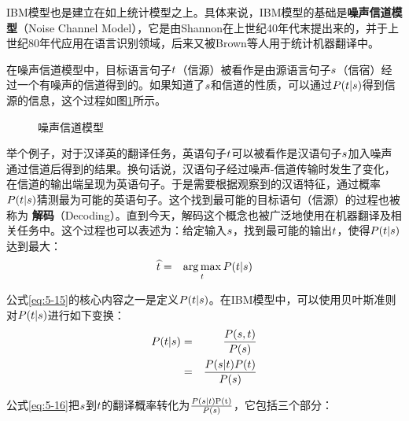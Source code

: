 \vspace{-0.5em}
\parinterval IBM模型也是建立在如上统计模型之上。具体来说，IBM模型的基础是{\small\sffamily\bfseries{噪声信道模型}}（Noise Channel Model），它是由Shannon在上世纪40年代末提出来的，并于上世纪80年代应用在语言识别领域，后来又被Brown等人用于统计机器翻译中。

\parinterval 在噪声信道模型中，目标语言句子${t}$（信源）被看作是由源语言句子${s}$（信宿）经过一个有噪声的信道得到的。如果知道了${s}$和信道的性质，可以通过${P}({t}|{s})$得到信源的信息，这个过程如图\ref{fig:5-13}所示。

\begin{figure}[htp]
    \centering

    \caption{噪声信道模型}
    \label{fig:5-13}
\end{figure}

\parinterval 举个例子，对于汉译英的翻译任务，英语句子${t}$可以被看作是汉语句子${s}$加入噪声通过信道后得到的结果。换句话说，汉语句子经过噪声-信道传输时发生了变化，在信道的输出端呈现为英语句子。于是需要根据观察到的汉语特征，通过概率${P}({t}|{s})$猜测最为可能的英语句子。这个找到最可能的目标语句（信源）的过程也被称为
{\small\sffamily\bfseries{解码}}（Decoding）。直到今天，解码这个概念也被广泛地使用在机器翻译及相关任务中。这个过程也可以表述为：给定输入${s}$，找到最可能的输出${t}$，使得${P}({t}|{s})$达到最大：
\begin{eqnarray}
\widehat{{t}}&=&\operatorname*{arg\,max}_{{t}}{P}({t}|{s})
\label{eq:5-15}
\end{eqnarray}

\parinterval 公式\eqref{eq:5-15}的核心内容之一是定义${P}({t}|{s})$。在IBM模型中，可以使用贝叶斯准则对${P}({t}|{s})$进行如下变换：
\begin{eqnarray}
{P}({t}|{s}) & = &\frac{{P}({s},{t})}{{P}({s})} \nonumber \\
                       & = & \frac{{P}({s}|{t}){P}({t})}{{P}({s})}
\label{eq:5-16}
\end{eqnarray}

\parinterval 公式\eqref{eq:5-16}把${s}$到${t}$的翻译概率转化为$\frac{{P}({s}|{t})\textrm{P(t)}}{{P}({s})}$，它包括三个部分：

